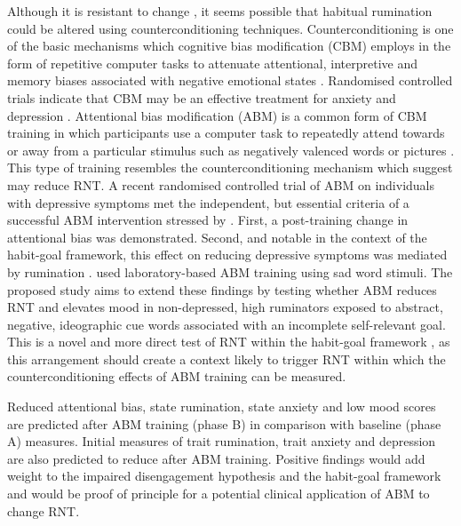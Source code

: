 \documentclass[man,floatsintext,a4paper,biblatex]{apa6}
\begin{document}
Although it is resistant to change \textcite{watkins_habit-goal_2014},
it seems possible that habitual rumination could be altered using
counterconditioning techniques.  Counterconditioning is one of
the basic mechanisms which cognitive bias modification (CBM)
employs in the form of repetitive computer tasks to attenuate
attentional, interpretive and memory biases associated with
negative emotional states \parencite{hertel_cognitive_2011}.  Randomised
controlled trials indicate that CBM may be an effective treatment
for anxiety \parencite{hakamata_attention_2010} and depression
\parencite{yang_attention_2014}.  Attentional bias modification (ABM)
is a common form of CBM training in which participants use a computer
task to repeatedly attend towards or away from a particular stimulus such
as negatively valenced words or pictures \parencite[see][for a recent
review]{macleod_attentional_2015}.  This type of training resembles the
counterconditioning mechanism which \textcite{watkins_habit-goal_2014}
 suggest may reduce RNT.  A recent randomised controlled trial
of ABM on individuals with depressive symptoms
\parencite{yang_attention_2014} met the independent, but
essential criteria of a successful ABM intervention stressed by
\textcite{macleod_attentional_2015}.  First, a post-training
change in attentional bias was demonstrated.  Second,
and notable in the context of the habit-goal framework, this
effect on reducing depressive symptoms was mediated by rumination
\parencite{yang_attention_2014}. \textcite{yang_attention_2014} used
laboratory-based ABM training using sad word stimuli.  The proposed
study aims to extend these findings by testing whether ABM reduces
RNT and elevates mood in non-depressed, high ruminators exposed to
abstract, negative, ideographic cue words associated with an incomplete
self-relevant goal.  This is a novel and more direct test of RNT within
the habit-goal framework \textcite{watkins_habit-goal_2014}, as this
arrangement should create a context likely to trigger RNT within which
the counterconditioning effects of ABM training can be measured.

Reduced attentional bias, state rumination, state anxiety and low mood
scores are predicted after ABM training (phase B) in comparison with
baseline (phase A) measures.  Initial measures of trait rumination, trait
anxiety and depression are also predicted to reduce after ABM training.
Positive findings would add weight to the impaired disengagement
hypothesis \textcite{koster_understanding_2011} and the habit-goal
framework \textcite{watkins_habit-goal_2014} and would be proof of
principle for a potential clinical application of ABM to change RNT.
\end{document}
